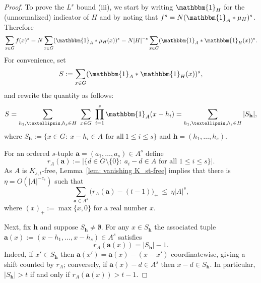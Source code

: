 \documentclass[10pt,a4paper]{amsart}
\newcommand{\e}{\mathbbm{1}}          %
\begin{document}
\begin{proof}
To prove the $L^s$ bound (iii), we start by writing $\e_H$ for the (unnormalized) indicator of $H$ and by noting that
$f^s=N(\e_A*\mu_H)^s$.  Therefore
\begin{equation}\label{eqn: fs}
\sum_{x\in G} f(x)^s
=
N\sum_{x\in G} (\e_A*\mu_H(x))^s
=
N|H|^{-s}\sum_{x\in G} (\e_A*\e_H(x))^s.  
\end{equation}
For convenience, set
\[
S:=\sum_{x\in G} (\e_A*\e_H(x))^s,
\]
and rewrite the quantity as follows:
\[
S=\sum_{h_1,\dots,h_s\in H}\ \sum_{x\in G}\ \prod_{i=1}^s \e_A(x-h_i)
=\sum_{h_1,\dots,h_s\in H} |S_{\mathbf{h}}|,
\]
where $S_{\mathbf{h}}:=\{x\in G:\ x-h_i\in A\,\ \text{for all}\ 1\le i \le s\}$ and $\mathbf{h}=(h_1,\dots,h_s)$.

For an ordered $s$-tuple $\mathbf{a}=(a_1,\dots,a_s)\in A^s$ define
\[
r_A(\mathbf{a})
:=
\bigl|\{d\in G\setminus\{0\}:\ a_i-d\in A \text{ for all }1\le i\le s\}\bigr|.
\]
As $A$ is $K_{s,t}$-free, Lemma~\ref{lem: vanishing K_st-free} implies that there is $\eta = O(|A|^{-c_s})$ such that 
\begin{equation}\label{eq:excess_rA}
\sum_{\mathbf{a}\in A^s}\bigl(r_A(\mathbf{a})-(t-1)\bigr)_+ \ \le\ \eta |A|^s,
\end{equation}
 where $(x)_+ := \max\{x,0\}$ for a real number $x$. 

Next, fix $\mathbf{h}$ and suppose $S_{\mathbf{h}}\neq\emptyset$.  For any $x\in S_{\mathbf{h}}$ the
associated tuple $\mathbf{a}(x):=(x-h_1,\dots,x-h_s)\in A^s$ satisfies
\begin{equation}\label{eq:rA_equals_size}
r_A(\mathbf{a}(x))=|S_{\mathbf{h}}|-1.
\end{equation}
Indeed, if $x'\in S_{\mathbf{h}}$ then $\mathbf{a}(x')=\mathbf{a}(x)-(x-x')$ coordinatewise, giving a shift
counted by $r_A$; conversely, if $\mathbf{a}(x)-d\in A^s$ then $x-d\in S_{\mathbf{h}}$.
In particular, $|S_{\mathbf{h}}|>t$ if and only if $r_A(\mathbf{a}(x))>t-1$.


\end{proof}
\end{document}
